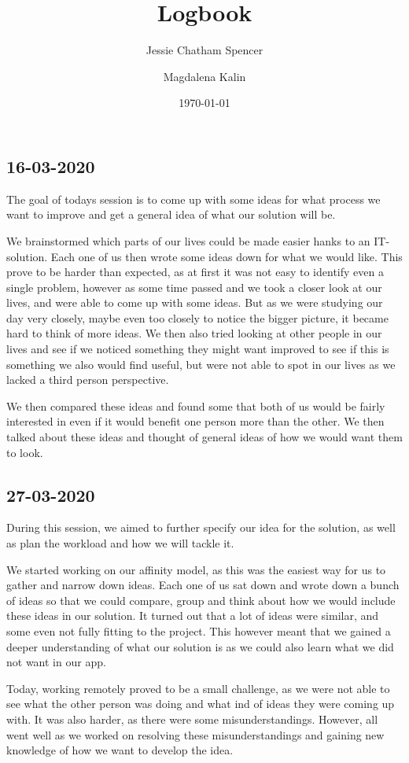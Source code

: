 \documentclass{article}
\title{Logbook}
\author{Jessie Chatham Spencer \and Magdalena Kalin}
\date{\today}
\begin{document}
\maketitle
\subsection*{16-03-2020}
The goal of todays session is to come up with some ideas for what process we want to improve and get a general idea of what our solution will be. 

We brainstormed which parts of our lives could be made easier hanks to an IT-solution. Each one of us then wrote some ideas down for what we would like. This prove to be harder than expected, as at first it was not easy to identify even a single problem, however as some time passed and we took a closer look at our lives, and were able to come up with some ideas. But as we were studying our day very closely, maybe even too closely to notice the bigger picture, it became hard to think of more ideas. We then also tried looking at other people in our lives and see if we noticed something they might want improved to see if this is something we also would find useful, but were not able to spot in our lives as we lacked a third person perspective.

We then compared these ideas and found some that both of us would be fairly interested in even if it would benefit one person more than the other. We then talked about these ideas and thought of general ideas of how we would want them to look.

\subsection*{27-03-2020}
During this session, we aimed to further specify our idea for the solution, as well as plan the workload and how we will tackle it.

We started working on our affinity model, as this was the easiest way for us to gather and narrow down ideas. Each one of us sat down and wrote down a bunch of ideas so that we could compare, group and think about how we would include these ideas in our solution. It turned out that a lot of ideas were similar, and some even not fully fitting to the project. This however meant that we gained a deeper understanding of what our solution is as we could also learn what we did not want in our app.

Today, working remotely proved to be a small challenge, as we were not able to see what the other person was doing and what ind of ideas they were coming up with. It was also harder, as there were some misunderstandings. However, all went well as we worked on resolving these misunderstandings and gaining new knowledge of how we want to develop the idea.
\end{document}
